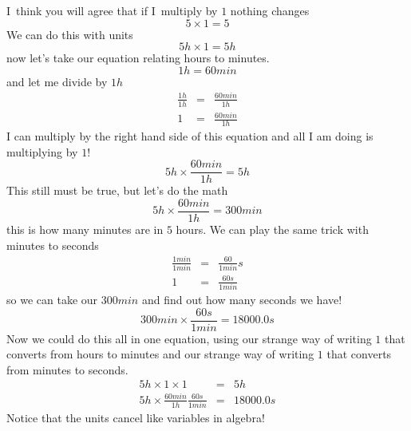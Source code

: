 \documentclass[]{Book}
\begin{document}
I\ think you will agree that if I\ multiply by $1$ nothing changes%
\begin{equation*}
	5\times 1=5
\end{equation*}%
We can do this with units%
\begin{equation*}
	5\unit{h}\times 1=5\unit{h}
\end{equation*}%
now let's take our equation relating hours to minutes.%
\begin{equation*}
	1\unit{h}=60\unit{min}
\end{equation*}%
and let me divide by $1\unit{h}$%
\begin{eqnarray*}
	\frac{1\unit{h}}{1\unit{h}} &=&\frac{60\unit{min}}{1\unit{h}} \\
	1 &=&\frac{60\unit{min}}{1\unit{h}}
\end{eqnarray*}%
I can multiply by the right hand side of this equation and all I am doing is
multiplying by $1!$%
\begin{equation*}
	5\unit{h}\times \frac{60\unit{min}}{1\unit{h}}=5\unit{h}
\end{equation*}%
This still must be true, but let's do the math%
\begin{equation*}
	5\unit{h}\times \frac{60\unit{min}}{1\unit{h}}=\allowbreak 300\unit{min}
\end{equation*}%
this is how many minutes are in $5$ hours. We can play the same trick with
minutes to seconds%
\begin{eqnarray*}
	\frac{1\unit{min}}{1\unit{min}} &=&\frac{60}{1\unit{min}}\unit{s} \\
	1 &=&\frac{60\unit{s}}{1\unit{min}}
\end{eqnarray*}%
so we can take our $300\unit{min}$ and find out how many seconds we have!%
\begin{equation*}
	\allowbreak 300\unit{min}\times \frac{60\unit{s}}{1\unit{min}}=18000.0\unit{s%
	}
\end{equation*}%
Now we could do this all in one equation, using our strange way of writing $%
1 $ that converts from hours to minutes and our strange way of writing $1$
that converts from minutes to seconds. 
\begin{eqnarray*}
	5\unit{h}\times 1\times 1 &=&5\unit{h} \\
	5\unit{h}\times \frac{60\unit{min}}{1\unit{h}}\frac{60\unit{s}}{1\unit{min}}
	&=&18000.0\unit{s}
\end{eqnarray*}%
Notice that the units cancel like variables in algebra!
\end{document}
